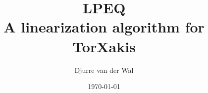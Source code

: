 \documentclass{report}%
\newcommand{\txs}{TorXakis}
\begin{document}
\title{LPEQ\\\large{A linearization algorithm for \txs{}}}
\author{Djurre van der Wal}
\date{\today}
\maketitle
\tableofcontents







\end{document}
